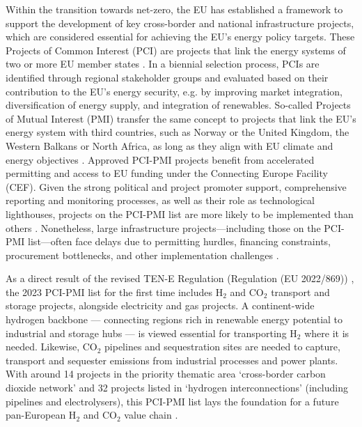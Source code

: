 \documentclass[pdflatex,sn-nature]{sn-jnl}%
\theoremstyle{thmstyleone}%
\theoremstyle{thmstyletwo}%
\theoremstyle{thmstylethree}%
\begin{document}
Within the transition towards net-zero, the EU has established a framework to support the development of key cross-border and national infrastructure projects, which are considered essential for achieving the EU's energy policy targets. These Projects of Common Interest (PCI) are projects that link the energy systems of two or more EU member states \cite{europeancommissionRegulationEUNo2022}. In a biennial selection process, PCIs are identified through regional stakeholder groups and evaluated based on their contribution to the EU's energy security, e.g. by improving market integration, diversification of energy supply, and integration of renewables. So-called Projects of Mutual Interest (PMI) transfer the same concept to projects that link the EU's energy system with third countries, such as Norway or the United Kingdom, the Western Balkans or North Africa, as long as they align with EU climate and energy objectives \cite{europeancommissionCommissionDelegatedRegulation2023}. Approved PCI-PMI projects benefit from accelerated permitting and access to EU funding under the Connecting Europe Facility (CEF). Given the strong political and project promoter support, comprehensive reporting and monitoring processes, as well as their role as technological lighthouses, projects on the PCI-PMI list are more likely to be implemented than others \cite{europeancommission.directorategeneralforenergy.InvestmentNeedsEuropean2025}. Nonetheless, large infrastructure projects—including those on the PCI-PMI list—often face delays due to permitting hurdles, financing constraints, procurement bottlenecks, and other implementation challenges \cite{acerConsolidatedReportProgress2023}. 

As a direct result of the revised TEN-E Regulation (Regulation (EU 2022/869)) \cite{europeanparliamentRegulationEU20222022}, the 2023 PCI-PMI list \cite{europeancommissionCommissionDelegatedRegulation2023,europeancommissionPCIPMITransparencyPlatform2024} for the first time includes H$_2$ and CO$_2$ transport and storage projects, alongside electricity and gas projects. A continent-wide hydrogen backbone --- connecting regions rich in renewable energy potential to industrial and storage hubs --- is viewed essential for transporting H$_2$ where it is needed. Likewise, CO$_2$ pipelines and sequestration sites are needed to capture, transport and sequester emissions from industrial processes and power plants. With around 14 projects in the priority thematic area `cross-border carbon dioxide network' and 32 projects listed in `hydrogen interconnections' (including pipelines and electrolysers), this PCI-PMI list lays the foundation for a future pan-European H$_2$ and CO$_2$ value chain \cite{europeancommissionAnnexFirstUnion2023}.
\end{document}
